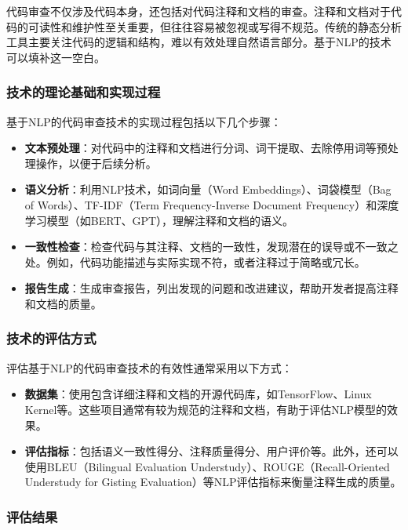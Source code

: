 \documentclass{article}
\begin{document}
代码审查不仅涉及代码本身，还包括对代码注释和文档的审查。注释和文档对于代码的可读性和维护性至关重要，但往往容易被忽视或写得不规范。传统的静态分析工具主要关注代码的逻辑和结构，难以有效处理自然语言部分。基于NLP的技术可以填补这一空白。

\subsubsection{技术的理论基础和实现过程}

基于NLP的代码审查技术的实现过程包括以下几个步骤：

\begin{itemize}
    \item \textbf{文本预处理}：对代码中的注释和文档进行分词、词干提取、去除停用词等预处理操作，以便于后续分析。
    \item \textbf{语义分析}：利用NLP技术，如词向量（Word Embeddings）、词袋模型（Bag of Words）、TF-IDF（Term Frequency-Inverse Document Frequency）和深度学习模型（如BERT、GPT），理解注释和文档的语义。
    \item \textbf{一致性检查}：检查代码与其注释、文档的一致性，发现潜在的误导或不一致之处。例如，代码功能描述与实际实现不符，或者注释过于简略或冗长。
    \item \textbf{报告生成}：生成审查报告，列出发现的问题和改进建议，帮助开发者提高注释和文档的质量。
\end{itemize}

\subsubsection{技术的评估方式}

评估基于NLP的代码审查技术的有效性通常采用以下方式：

\begin{itemize}
    \item \textbf{数据集}：使用包含详细注释和文档的开源代码库，如TensorFlow、Linux Kernel等。这些项目通常有较为规范的注释和文档，有助于评估NLP模型的效果。
    \item \textbf{评估指标}：包括语义一致性得分、注释质量得分、用户评价等。此外，还可以使用BLEU（Bilingual Evaluation Understudy）、ROUGE（Recall-Oriented Understudy for Gisting Evaluation）等NLP评估指标来衡量注释生成的质量。
\end{itemize}

\subsubsection{评估结果}
\end{document}
